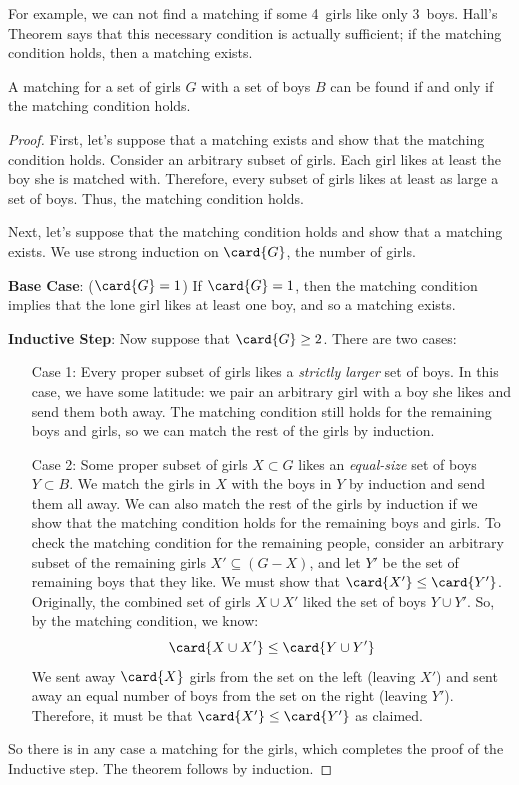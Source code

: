 For example, we can not find a matching if some 4~girls like only 3~boys.
Hall's Theorem says that this necessary condition is actually sufficient;
if the matching condition holds, then a matching exists.

\begin{theorem}
A matching for a set of girls $G$ with a set of boys $B$ can be found if
and only if the matching condition holds.
\end{theorem}

\begin{proof}
First, let's suppose that a matching exists and show that the matching condition
holds.  Consider an arbitrary subset of girls.  Each girl likes at least the boy she
is matched with.  Therefore, every subset of girls likes at least as large a set of
boys.  Thus, the matching condition holds.

Next, let's suppose that the matching condition holds and show that a matching
exists.  We use strong induction on $\card{G}$, the number of girls.

\textbf{Base Case}: ($\card{G}=1$) If $\card{G} = 1$, then the 
matching condition implies that the lone girl likes at least one boy, and so a
matching exists.

\textbf{Inductive Step}: Now suppose that $\card{G} \geq 2$.  There are two cases:

\begin{itemize}

\item[Case 1:] Every proper subset of girls likes a \emph{strictly larger} set of
  boys.  In this case, we have some latitude: we pair an arbitrary girl with a boy
  she likes and send them both away.  The matching condition still holds for the
  remaining boys and girls, so we can match the rest of the girls by induction.

\item[Case 2:] Some proper subset of girls $X \subset G$ likes an \emph{equal-size}
  set of boys $Y \subset B$.  We match the girls in $X$ with the boys in $Y$ by
  induction and send them all away.  We can also match the rest of the girls by
  induction if we show that the matching condition holds for the remaining boys and
  girls.  To check the matching condition for the remaining people, consider an
  arbitrary subset of the remaining girls $X' \subseteq (G - X)$, and let $Y'$ be the
  set of remaining boys that they like.  We must show that
  $\card{X'} \leq \card{Y'}$.  Originally, the combined set of girls $X \cup X'$
  liked the set of boys $Y \cup Y'$.  So, by the matching condition, we know:
%
\[
\card{X \cup X'}  \leq  \card{Y \cup Y'}
\]
%
We sent away $\card{X}$ girls from the set on the left (leaving $X'$) and sent away
an equal number of boys from the set on the right (leaving $Y'$).  Therefore, it must
be that $\card{X'}
\leq \card{Y'}$ as claimed.
\end{itemize}

So there is in any case a matching for the girls, which completes the proof of the
Inductive step.   The theorem follows by induction.
\end{proof}

